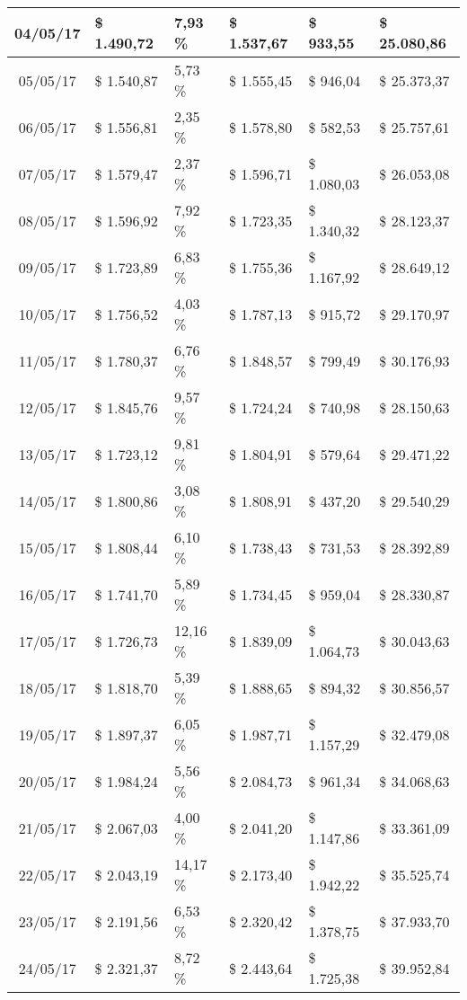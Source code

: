 \begin{small}
\begin{longtable}{|c|l|l|l|l|l|}
04/05/17 & \$ 1.490,72 & 7,93 \% & \$ 1.537,67 & \$ 933,55 & \$ 25.080,86 \\ \hline
05/05/17 & \$ 1.540,87 & 5,73 \% & \$ 1.555,45 & \$ 946,04 & \$ 25.373,37 \\ \hline
06/05/17 & \$ 1.556,81 & 2,35 \% & \$ 1.578,80 & \$ 582,53 & \$ 25.757,61 \\ \hline
07/05/17 & \$ 1.579,47 & 2,37 \% & \$ 1.596,71 & \$ 1.080,03 & \$ 26.053,08 \\ \hline
08/05/17 & \$ 1.596,92 & 7,92 \% & \$ 1.723,35 & \$ 1.340,32 & \$ 28.123,37 \\ \hline
09/05/17 & \$ 1.723,89 & 6,83 \% & \$ 1.755,36 & \$ 1.167,92 & \$ 28.649,12 \\ \hline
10/05/17 & \$ 1.756,52 & 4,03 \% & \$ 1.787,13 & \$ 915,72 & \$ 29.170,97 \\ \hline
11/05/17 & \$ 1.780,37 & 6,76 \% & \$ 1.848,57 & \$ 799,49 & \$ 30.176,93 \\ \hline
12/05/17 & \$ 1.845,76 & 9,57 \% & \$ 1.724,24 & \$ 740,98 & \$ 28.150,63 \\ \hline
13/05/17 & \$ 1.723,12 & 9,81 \% & \$ 1.804,91 & \$ 579,64 & \$ 29.471,22 \\ \hline
14/05/17 & \$ 1.800,86 & 3,08 \% & \$ 1.808,91 & \$ 437,20 & \$ 29.540,29 \\ \hline
15/05/17 & \$ 1.808,44 & 6,10 \% & \$ 1.738,43 & \$ 731,53 & \$ 28.392,89 \\ \hline
16/05/17 & \$ 1.741,70 & 5,89 \% & \$ 1.734,45 & \$ 959,04 & \$ 28.330,87 \\ \hline
17/05/17 & \$ 1.726,73 & 12,16 \% & \$ 1.839,09 & \$ 1.064,73 & \$ 30.043,63 \\ \hline
18/05/17 & \$ 1.818,70 & 5,39 \% & \$ 1.888,65 & \$ 894,32 & \$ 30.856,57 \\ \hline
19/05/17 & \$ 1.897,37 & 6,05 \% & \$ 1.987,71 & \$ 1.157,29 & \$ 32.479,08 \\ \hline
20/05/17 & \$ 1.984,24 & 5,56 \% & \$ 2.084,73 & \$ 961,34 & \$ 34.068,63 \\ \hline
21/05/17 & \$ 2.067,03 & 4,00 \% & \$ 2.041,20 & \$ 1.147,86 & \$ 33.361,09 \\ \hline
22/05/17 & \$ 2.043,19 & 14,17 \% & \$ 2.173,40 & \$ 1.942,22 & \$ 35.525,74 \\ \hline
23/05/17 & \$ 2.191,56 & 6,53 \% & \$ 2.320,42 & \$ 1.378,75 & \$ 37.933,70 \\ \hline
24/05/17 & \$ 2.321,37 & 8,72 \% & \$ 2.443,64 & \$ 1.725,38 & \$ 39.952,84 \\ \hline

\end{longtable}
\end{small}
